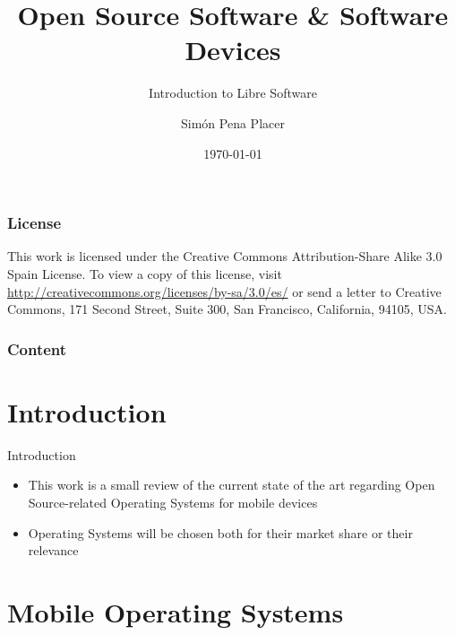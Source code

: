\documentclass{beamer}
\title{Open Source Software \& Software Devices}
\subtitle{Introduction to Libre Software}
\author{Sim\'on Pena Placer}
\institute{M\'aster Software Libre, 2009-2010. A Coru\~na Edition}
\date{\today}
\begin{document}
\begin{frame}
	\titlepage
\end{frame}

\begin{frame}
	\frametitle{License}
	\begin{center}
	\end{center}
This work is licensed under the Creative Commons Attribution-Share Alike 3.0 Spain License. To view a copy of this license, visit \url{http://creativecommons.org/licenses/by-sa/3.0/es/} or send a letter to Creative Commons, 171 Second Street, Suite 300, San Francisco, California, 94105, USA.
\end{frame}

\begin{frame}
	\frametitle{Content}
	\tableofcontents
\end{frame}

{}

\section{Introduction}

\begin{frame}{Introduction}
\begin{itemize}
\item This work is a small review of the current state of the art regarding Open Source-related Operating Systems for mobile devices
\item Operating Systems will be chosen both for their market share or their relevance
\end{itemize}
\end{frame}

\section{Mobile Operating Systems}
\end{document}
